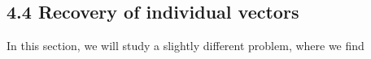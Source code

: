 \documentclass[a4paper]{article}
\begin{document}
\subsection*{4.4  Recovery of individual vectors}

In this section, we will study a slightly different problem, where we find
    
 
\end{document}
